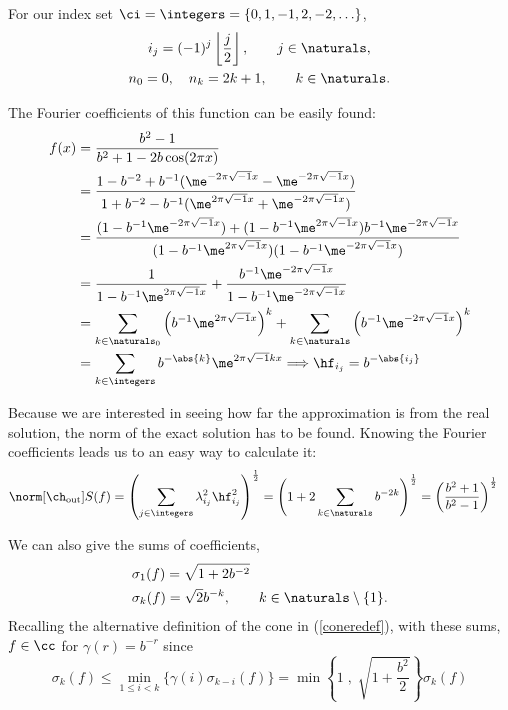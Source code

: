\documentclass[final]{elsarticle}
\newcommand{\chout}{\ch_{\text{\rm{out}}}}
\theoremstyle{definition}
\theoremstyle{remark}
\begin{document}
For our index set $\ci=\integers=\{0,1,-1,2,-2,\ldots\}$,
\begin{gather*}
i_j=(-1)^{j}\left\lfloor\frac{j}{2}\right\rfloor,\qquad j\in\naturals,\\
n_0=0,\quad n_k=2k+1, \qquad k\in\naturals.
\end{gather*}

The Fourier coefficients of this function can be easily found:
\begin{align*}
f(x)&=\frac{b^2-1}{b^2+1-2b\cos(2\pi x)}\\
&=\frac{1-b^{-2}+b^{-1}(\me^{-2\pi\sqrt{-1}x}-\me^{-2\pi\sqrt{-1}x})}{1+b^{-2}-b^{-1}(\me^{2\pi\sqrt{-1}x}+\me^{-2\pi\sqrt{-1}x})}\\
&=\frac{(1-b^{-1}\me^{-2\pi\sqrt{-1}x})+(1-b^{-1}\me^{2\pi\sqrt{-1}x})b^{-1}\me^{-2\pi\sqrt{-1}x}}{(1-b^{-1}\me^{2\pi\sqrt{-1}x})(1-b^{-1}\me^{-2\pi\sqrt{-1}x})}\\
&=\frac{1}{1-b^{-1}\me^{2\pi\sqrt{-1}x}}+\frac{b^{-1}\me^{-2\pi\sqrt{-1}x}}{1-b^{-1}\me^{-2\pi\sqrt{-1}x}}\\
&=\sum_{k\in\naturals_0}\left(b^{-1}\me^{2\pi\sqrt{-1}x}\right)^k+\sum_{k\in\naturals}\left(b^{-1}\me^{-2\pi\sqrt{-1}x}\right)^k\\
&=\sum_{k\in\integers}b^{-\abs{k}}\me^{2\pi\sqrt{-1}kx}\Longrightarrow\hf_{i_j}=b^{-\abs{i_j}}
\end{align*}

Because we are interested in seeing how far the approximation is from the real solution, the norm of the exact solution has to be found. Knowing the Fourier coefficients leads us to an easy way to calculate it:
\begin{align*}
\norm[\chout]{S(f)}&=\left(\sum_{j\in\integers}\lambda_{i_j}^2\hf_{i_j}^2\right)^{\frac{1}{2}} =\left(1+2\sum_{k\in\naturals}b^{-2k}\right)^{\frac{1}{2}}=\left(\frac{b^2+1}{b^2-1}\right)^{\frac{1}{2}}
\end{align*}

We can also give the sums of coefficients,
\begin{align*}
&\sigma_1(f)=\sqrt{1+2b^{-2}}\\
&\sigma_k(f)=\sqrt{2}b^{-k}, \qquad k \in\naturals\setminus\{1\}.
\end{align*}
Recalling the alternative definition of the cone in (\ref{coneredef}), with these sums, $f\in\cc$ for $\gamma(r)=b^{-r}$ since
\begin{equation*}
\sigma_k(f) \le \min_{1 \le i <k}\{\gamma(i)\sigma_{k-i}(f)\}=\min\left\{1 \; , \; \sqrt{1+\frac{b^2}{2}} \right\}\sigma_k(f)
\end{equation*}
\end{document}
